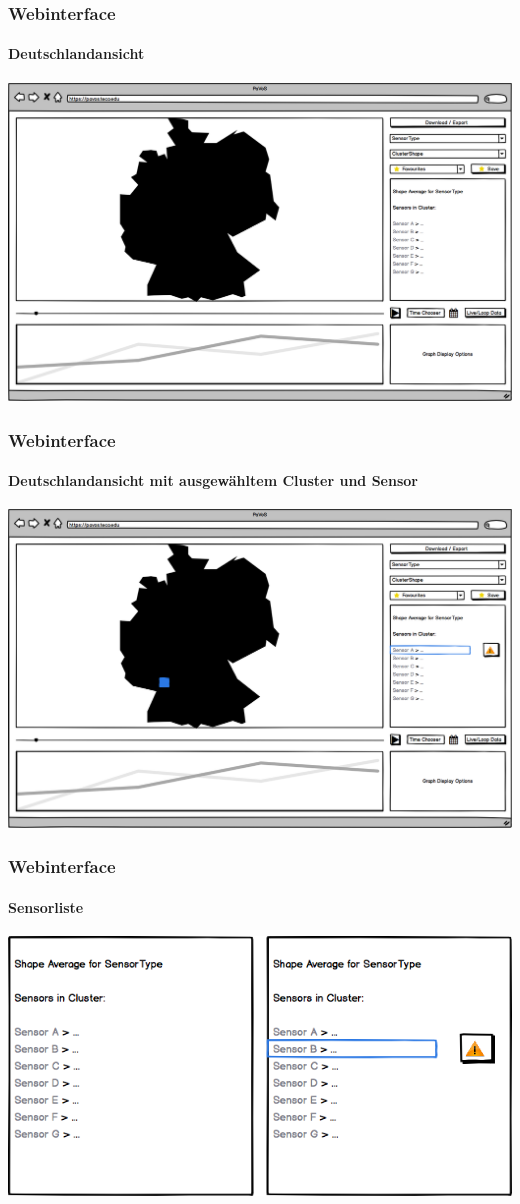 \documentclass{beamer}
\begin{document}
\begin{frame}
	\frametitle{Webinterface}
	\framesubtitle{Deutschlandansicht}
	\centering
	\includegraphics[width=\linewidth]{gui/frontend/FrontGUIGermany}
\end{frame}

\begin{frame}
	\frametitle{Webinterface}
	\framesubtitle{Deutschlandansicht mit ausgewähltem Cluster und Sensor}
	\centering
	\includegraphics[width=\linewidth]{gui/frontend/FrontGUIGermanyWithShapeSelection}
\end{frame}

\begin{frame}
	\frametitle{Webinterface}
	\framesubtitle{Sensorliste}
	\centering
	\includegraphics[width=\linewidth]{gui/frontend/FrontGUISensorListAloneAndWithSelection}
\end{frame}
\end{document}

